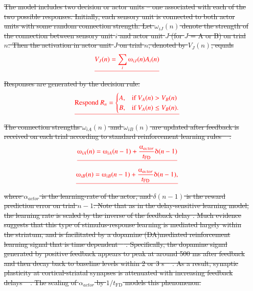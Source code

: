 \documentclass[doc, floatsintext]{apa7}
\providecommand{\DIFdel}[1]{{\protect\color{red}\sout{#1}}}                      %
\begin{document}
\DIFdel{The model includes two decision or actor units -- one
associated with each of the
two possible responses.
Initially, each sensory unit is connected to both actor
units with some random connection strength. Let
$\omega_{iJ}(n)$ denote the strength of the connection
between sensory unit $i$ and actor unit $J$ (for $J$ = A or
B) on trial $n$. Then the activation in actor unit $J$ on
trial $n$, denoted by $V_J(n)$, equals
}\begin{displaymath}
  \DIFdel{V_J(n) = \sum_{i} \omega_{iJ}(n) A_i(n)
}\end{displaymath}%
\DIFdel{Responses are generated by the decision rule:
}\begin{displaymath}
 \DIFdel{\text{Respond } R_n =
  \begin{cases}
    A, & \text{if $V_A(n) > V_B(n)$}\\
    B, & \text{if $V_A(n) \leq V_B(n).$}
  \end{cases}
}\end{displaymath}%
\DIFdel{The connection strengths $\omega_{iA}(n)$ and
$\omega_{iB}(n)$ are updated after feedback is received on
each trial according to standard reinforcement learning
rules \mbox{%
\parencite{SuttonBarto1998}}\hskip0pt%
:
}\begin{displaymath}
  \DIFdel{\omega_{iA}(n) = \omega_{iA}(n-1) + \frac{\alpha_{actor}}{t_\text{FD}} \delta(n-1)
}\end{displaymath}%
\begin{displaymath}
  \DIFdel{\omega_{iB}(n) = \omega_{iB}(n-1) + \frac{\alpha_{actor}}{t_\text{FD}} \delta(n-1),
}\end{displaymath}%
\DIFdel{where $\alpha_{actor}$ is the learning-rate of the actor, and
$\delta(n-1)$ is the reward prediction error on trial $n-1$.
Note that as in the delay-sensitive learning model, the
learning rate is scaled by the inverse of the feedback delay
. Much evidence suggests that this type of
stimulus-response learning is mediated largely within the
striatum, and is facilitated by a dopamine (DA)mediated
reinforcement learning signal that is time dependent
\mbox{%
\parencite[e.g.,][]{ValentinMaddoxAshby2014}}\hskip0pt%
. Specifically,
the dopamine signal generated by positive feedback appears
to peak at around 500 ms after feedback and then decay back
to baseline levels within 2 or 3 s
\mbox{%
\parencite{YagishitaEtAl2014}}\hskip0pt%
. As a result, synaptic
plasticity at cortical-striatal synapses is attenuated with
increasing feedback delays \mbox{%
\parencite{YagishitaEtAl2014}}\hskip0pt%
.
The scaling of $\alpha_{actor}$ by $1/t_\text{FD}$ models this
phenomenon.
}%
\end{document}

